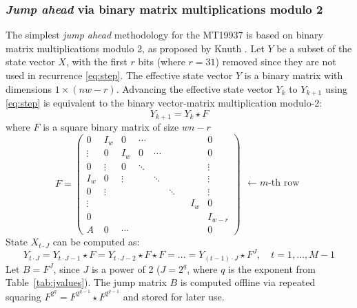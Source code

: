 \documentclass[preprint,1p,times]{elsarticle}
\begin{document}
\subsubsection{\textit{Jump ahead} via binary matrix multiplications modulo 2}
\label{sec:jumpahead}
The simplest \textit{jump ahead} methodology for the MT19937 is based on binary matrix multiplications modulo 2, as proposed by Knuth \cite{knuth}. Let $Y$ be a subset of the state vector $X$, with the first $r$ bits (where $r = 31$) removed since they are not used in recurrence \eqref{eq:step}.
The effective state vector $Y$ is a binary matrix with dimensions $1\times (nw-r)$. Advancing the effective state vector $Y_k$ to $Y_{k+1}$ using \eqref{eq:step} is equivalent to the binary vector-matrix multiplication modulo-2:
\begin{equation}
\label{eq:onestep}
Y_{k+1} = Y_k \star F
\end{equation}
where $F$ is a square binary matrix of size $wn-r$
\begin{equation}
\label{eq:transmat}
    F = \begin{pmatrix}
        0 & I_w & 0 & \cdots & &  &  &  & 0 \\
        \vdots & 0 & I_w & 0 & \cdots & & & & 0\\
        0 & \vdots & 0 & \ddots & &&& & \vdots \\
        I_w & 0 & \vdots & & \ddots & && & \vdots \\
        0 & \vdots &  & & & \ddots & & & \vdots \\
        \vdots &  &  &  & &&& I_w & 0 \\
        0 &  &  & &  & &&&I_{w - r} \\
        A & 0 & \cdots & &  &  &&& 0
\end{pmatrix}
\begin{matrix}
\\ \\ \\ \leftarrow m\text{-th row} \\ \\ \\ \\
\end{matrix}
\end{equation}
State $X_{t \cdot J}$ can be computed as:
\begin{equation}
\label{eq:jumpahead}
    Y_{t \cdot J} = Y_{t \cdot J - 1} \star F = Y_{t \cdot J - 2}  \star F \star F = \ldots = Y_{(t-1) \cdot J}  \star F^{J}, \quad t=1,\dots,M-1
\end{equation}
Let $B=F^J$, since $J$ is a power of 2 ($J=2^{q}$, where $q$ is the exponent from Table~\ref{tab:jvalues}).
The jump matrix $B$ is computed offline via repeated squaring $F^{2^q} = F^{2^{q-1}} \star F^{2^{q-1}}$ and stored for later use.
\end{document}

